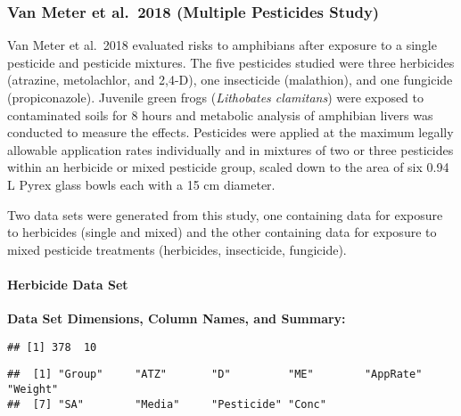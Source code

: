 \documentclass[
]{article}
\begin{document}
\hypertarget{van-meter-et-al.-2018-multiple-pesticides-study}{%
\subsubsection{Van Meter et al.~2018 (Multiple Pesticides
Study)}\label{van-meter-et-al.-2018-multiple-pesticides-study}}

Van Meter et al.~2018 evaluated risks to amphibians after exposure to a
single pesticide and pesticide mixtures. The five pesticides studied
were three herbicides (atrazine, metolachlor, and 2,4-D), one
insecticide (malathion), and one fungicide (propiconazole). Juvenile
green frogs (\emph{Lithobates clamitans}) were exposed to contaminated
soils for 8 hours and metabolic analysis of amphibian livers was
conducted to measure the effects. Pesticides were applied at the maximum
legally allowable application rates individually and in mixtures of two
or three pesticides within an herbicide or mixed pesticide group, scaled
down to the area of six 0.94 L Pyrex glass bowls each with a 15 cm
diameter.

Two data sets were generated from this study, one containing data for
exposure to herbicides (single and mixed) and the other containing data
for exposure to mixed pesticide treatments (herbicides, insecticide,
fungicide).

\hypertarget{herbicide-data-set}{%
\paragraph{\texorpdfstring{\textbf{Herbicide Data
Set}}{Herbicide Data Set}}\label{herbicide-data-set}}

\textbf{Data Set Dimensions, Column Names, and Summary:}

\begin{verbatim}
## [1] 378  10
\end{verbatim}

\begin{verbatim}
##  [1] "Group"     "ATZ"       "D"         "ME"        "AppRate"   "Weight"   
##  [7] "SA"        "Media"     "Pesticide" "Conc"
\end{verbatim}
\end{document}
